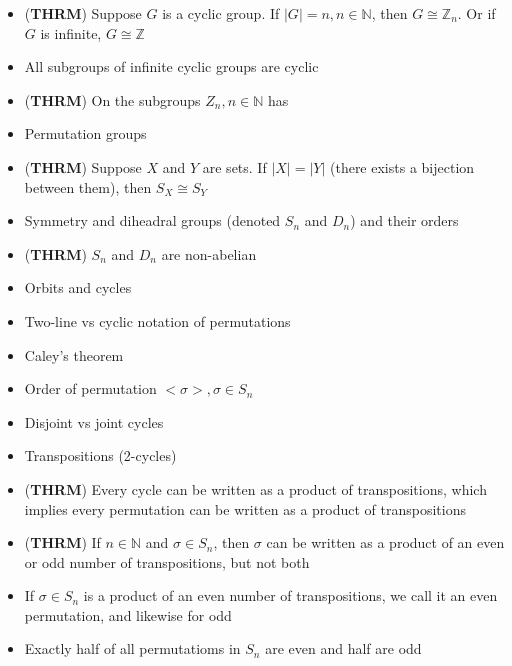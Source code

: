 \documentclass[12pt, letterpaper]{article}
\begin{document}
\begin{multicols}{2}
\begin{itemize}
        \item (\textbf{THRM}) Suppose $G$ is a cyclic group. If $|G| = n, n \in \mathbb{N}$, then
        $G \cong \mathbb{Z}_n$. Or if $G$ is infinite, $G \cong \mathbb{Z}$
        
        \item All subgroups of infinite cyclic groups are cyclic
      
        \item (\textbf{THRM}) On the subgroups $Z_n, n \in \mathbb{N}$ has
        
        \item Permutation groups
      
        \item (\textbf{THRM}) Suppose $X$ and $Y$ are sets. If $|X| = |Y|$ (there exists a bijection between them), 
        then $S_X \cong S_Y$
        
        \item Symmetry and diheadral groups (denoted $S_n$ and $D_n$) and their orders
        
        \item (\textbf{THRM}) $S_n$ and $D_n$ are non-abelian
        
        \item Orbits and cycles
        
        \item Two-line vs cyclic notation of permutations
        
        \item Caley's theorem
      
        \item Order of permutation ${<}\sigma{>}, \sigma \in S_n$
        
        \item Disjoint vs joint cycles
      
        \item Transpositions (2-cycles)
        
        \item (\textbf{THRM}) Every cycle can be written as a product of transpositions,
        which implies every permutation can be written as a product of transpositions
      
        \item (\textbf{THRM}) If $n \in \mathbb{N}$ and $\sigma \in S_n$, then $\sigma$ can be 
        written as a product of an even or odd number of transpositions, but not both
        
        \item If $\sigma \in S_n$ is a product of an even number of transpositions, we call it an even 
        permutation, and likewise for odd
      
        \item Exactly half of all permutatioms in $S_n$ are even and half are odd
    \end{itemize}

\end{multicols}
\end{document}
